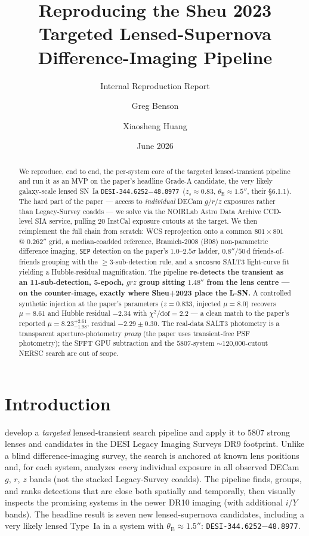 \documentclass[11pt,letterpaper]{article}
\title{Reproducing the Sheu 2023 Targeted Lensed-Supernova\\
       Difference-Imaging Pipeline}
\author{Greg Benson \and Xiaosheng Huang}
\date{June 2026}
\newcommand{\thetaE}{\ensuremath{\theta_{\mathrm{E}}}}
\newcommand{\muamp}{\ensuremath{\mu}}
\newcommand{\target}{\texttt{DESI-344.6252$-$48.8977}}
\begin{document}
\maketitle
\subtitle{Internal Reproduction Report}

\begin{abstract}
We reproduce, end to end, the per-system core of the \citet{sheu2023lensedsne}
targeted lensed-transient pipeline and run it as an MVP on the paper's
headline Grade-A candidate, the very likely galaxy-scale lensed
SN~Ia \target\ ($z_s\!\approx\!0.83$, $\thetaE\!\approx\!1.5''$, their
\S6.1.1). The hard part of the paper --- access to \emph{individual} DECam
$g/r/z$ exposures rather than Legacy-Survey coadds --- we solve via the
NOIRLab Astro Data Archive CCD-level SIA service, pulling 20 InstCal
exposure cutouts at the target. We then reimplement the full chain from
scratch: WCS reprojection onto a common $801\times801$ @ $0.262''$ grid, a
median-coadded reference, Bramich-2008 (B08) non-parametric difference
imaging, \texttt{SEP} detection on the paper's $1.0$--$2.5\sigma$ ladder,
$0.8''/50$\,d friends-of-friends grouping with the $\geq3$-sub-detection
rule, and a \texttt{sncosmo} SALT3 light-curve fit yielding a Hubble-residual
magnification. The pipeline \textbf{re-detects the transient as an
11-sub-detection, 5-epoch, $grz$ group sitting $1.48''$ from the lens centre
--- on the counter-image, exactly where Sheu+2023 place the L-SN.} A
controlled synthetic injection at the paper's parameters
($z=0.833$, injected $\muamp=8.0$) recovers $\muamp=8.61$ and Hubble residual
$-2.34$ with $\chi^2/\mathrm{dof}=2.2$ --- a clean match to the paper's
reported $\muamp = 8.23^{+2.61}_{-1.98}$, residual $-2.29\pm0.30$. The
real-data SALT3 photometry is a transparent aperture-photometry \emph{proxy}
(the paper uses transient-free PSF photometry); the SFFT GPU subtraction and
the $5807$-system $\sim$120{,}000-cutout NERSC search are out of scope.
\end{abstract}

\tableofcontents

\bigskip

\section{Introduction}

\citet{sheu2023lensedsne} develop a \emph{targeted} lensed-transient search
pipeline and apply it to $5807$ strong lenses and candidates in the DESI
Legacy Imaging Surveys \autocite{dey2019legacy} DR9 footprint. Unlike a
blind difference-imaging survey, the search is anchored at known lens
positions and, for each system, analyzes \emph{every} individual exposure in
all observed DECam $g$, $r$, $z$ bands (not the stacked Legacy-Survey
coadds). The pipeline finds, groups, and ranks detections that are close
both spatially and temporally, then visually inspects the promising systems
in the newer DR10 imaging (with additional $i$/$Y$ bands). The headline
result is seven new lensed-supernova candidates, including a very likely
lensed Type~Ia in a system with $\thetaE\approx1.5''$: \target.
\end{document}
